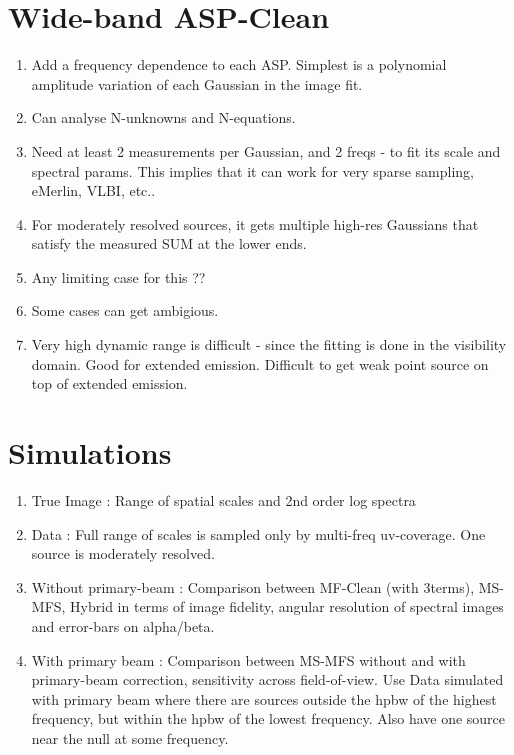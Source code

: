 \documentclass[structabstract]{aa}
\begin{document}

\section{Wide-band ASP-Clean}
\begin{enumerate}
\item Add a frequency dependence to each ASP. Simplest is a polynomial amplitude variation of each Gaussian in the image fit.
\item Can analyse N-unknowns and N-equations.
\item Need at least 2 measurements per Gaussian, and 2 freqs - to fit its scale and spectral params. This implies that it can work for very sparse sampling, eMerlin, VLBI, etc..
\item For moderately resolved sources, it gets multiple high-res Gaussians that satisfy the measured SUM at the lower ends.
\item Any limiting case for this ?? 
\item Some cases can get ambigious.
\item Very high dynamic range is difficult - since the fitting is done in the visibility domain. Good for extended emission. Difficult to get weak point source on top of extended emission.
\end{enumerate}


\section{Simulations}\label{SIMULATIONS}
\begin{enumerate}
\item True Image : Range of spatial scales and 2nd order log spectra 
\item Data : Full range of scales is sampled only by multi-freq uv-coverage. One source is moderately resolved.
\item Without primary-beam : Comparison between MF-Clean (with 3terms), MS-MFS, Hybrid  in terms of 
image fidelity, angular resolution of spectral images and error-bars on alpha/beta.
\item With primary beam : Comparison between MS-MFS without and with primary-beam correction,
	sensitivity across field-of-view.  Use Data simulated with primary beam where
	there are sources outside the hpbw of the highest frequency, 
	but within the hpbw of the lowest frequency.  
	Also have one source near the null at some frequency.
\end{enumerate}
\end{document}
